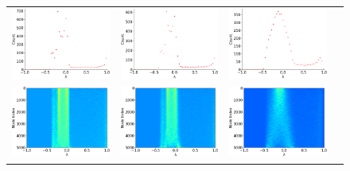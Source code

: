 \documentclass[senior,final,11pt]{iscs-thesis}
\begin{document}
\begin{figure}[htbp]
  \setlength\tabcolsep{0pt}
  \hspace{-1.0cm}
  \begin{tabular}{cccc}
    \includegraphics[width=45mm]{figure/small_world_5000_5_0001txt_dos.png} &
    \includegraphics[width=45mm]{figure/small_world_5000_5_0010txt_dos.png} &
    \includegraphics[width=45mm]{figure/small_world_5000_5_0100txt_dos.png} \\
    \includegraphics[width=45mm]{figure/small_world_5000_5_0001txt_pdos.png} &
    \includegraphics[width=45mm]{figure/small_world_5000_5_0010txt_pdos.png} &
    \includegraphics[width=45mm]{figure/small_world_5000_5_0100txt_pdos.png} \\

\end{tabular}
\end{figure}
\end{document}
